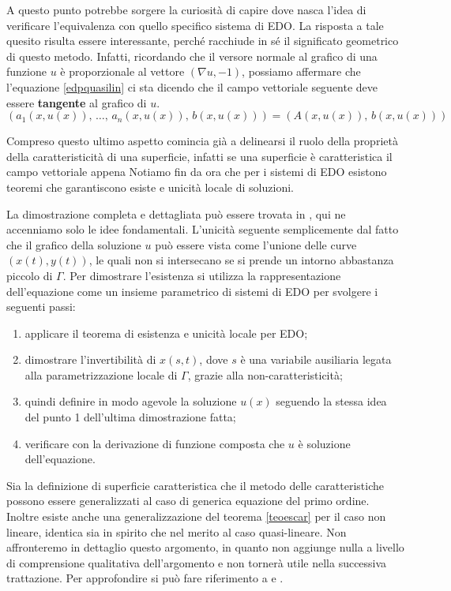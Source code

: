 A questo punto potrebbe sorgere la curiosità di capire dove nasca l'idea di verificare l'equivalenza con quello specifico sistema di EDO. La risposta a tale quesito risulta essere interessante, perché racchiude in sé il significato geometrico di questo metodo. Infatti, ricordando che il versore normale al grafico di una funzione $u$ è proporzionale al vettore $(\nabla u , -1)$, possiamo affermare che l'equazione \eqref{edpquasilin} ci sta dicendo che il campo vettoriale seguente deve essere  \textbf{tangente} al grafico di $u$.
$$(a_1(x,u(x)),\, \ldots ,\, a_n(x,u(x)),\, b(x,u(x)))=(A(x,u(x)),\, b(x,u(x)))$$

Compreso questo ultimo aspetto comincia già a delinearsi il ruolo della proprietà della caratteristicità di una superficie, infatti se una superficie è caratteristica il campo vettoriale appena 
Notiamo fin da ora che per i sistemi di EDO esistono teoremi che garantiscono esiste e unicità locale di soluzioni.
\begin{theorem}\label{teoescar}
\end{theorem}
La dimostrazione completa e dettagliata può essere trovata in \cite[cap.1]{Folland}, qui ne accenniamo solo le idee fondamentali. L'unicità seguente semplicemente dal fatto che il grafico della soluzione $u$ può essere vista come l'unione delle curve $(x(t),y(t))$, le quali non si intersecano se si prende un intorno abbastanza piccolo di $\Gamma$. Per dimostrare l'esistenza si utilizza la rappresentazione dell'equazione come un insieme parametrico di sistemi di EDO per svolgere i seguenti passi:
\begin{enumerate}
\item applicare il teorema di esistenza e unicità locale per EDO;
\item dimostrare l'invertibilità di $x(s,t)$, dove $s$ è una variabile ausiliaria legata alla parametrizzazione locale di $\Gamma$, grazie alla non-caratteristicità;
\item quindi definire in modo agevole la soluzione $u(x)$ seguendo la stessa idea del punto 1 dell'ultima dimostrazione fatta;
\item verificare con la derivazione di funzione composta che $u$ è soluzione dell'equazione.
\end{enumerate}
Sia la definizione di superficie caratteristica che il metodo delle caratteristiche possono essere generalizzati al caso di generica equazione del primo ordine. Inoltre esiste anche una generalizzazione del teorema \ref{teoescar} per il caso non lineare, identica sia in spirito che nel merito al caso quasi-lineare.
Non affronteremo in dettaglio questo argomento, in quanto non aggiunge nulla a livello di comprensione qualitativa dell'argomento e non tornerà utile nella successiva trattazione. Per approfondire si può fare riferimento a \cite[cap.1]{Folland} e \cite[cap.3]{Evans}.

